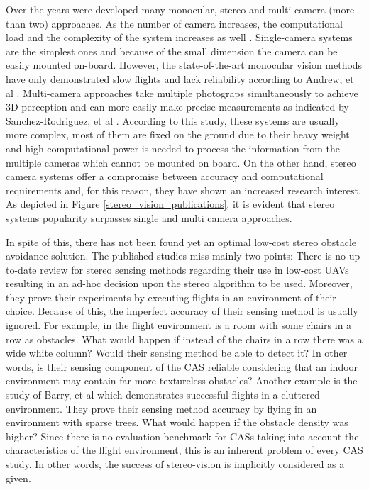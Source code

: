 Over the years were developed many monocular, stereo and multi-camera (more than two) approaches. As the number of camera increases, the computational load and the complexity of the system increases as well \cite{Sanchez-Rodriguez2018a}. Single-camera systems are the simplest ones and because of the small dimension the camera can be easily mounted on-board. However, the state-of-the-art monocular vision methods have only demonstrated slow flights and lack reliability according to Andrew, et al \cite{Barry2018}. Multi-camera approaches take multiple photograps simultaneously to achieve 3D perception and can more easily make precise measurements as indicated by Sanchez-Rodriguez, et al \cite{Sanchez-Rodriguez2018a}. According to this study, these systems are usually more complex, most of them are fixed on the ground due to their heavy weight and high computational power is needed to process the information from the multiple cameras which cannot be mounted on board. On the other hand, stereo camera systems offer a compromise between accuracy and computational requirements and, for this reason, they have shown an increased research interest. As depicted in Figure \ref{stereo_vision_publications}, it is evident that stereo systems popularity surpasses single and multi camera approaches. 

In spite of this, there has not been found yet an optimal low-cost stereo obstacle avoidance solution. The published studies miss mainly two points: There is no up-to-date review for stereo sensing methods regarding their use in low-cost \acp{UAV} resulting in an ad-hoc decision upon the stereo algorithm to be used. Moreover, they prove their experiments by executing flights in an environment of their choice. Because of this, the imperfect accuracy of their sensing method is usually ignored. For example, in \cite{Heng2011} the flight environment is a room with some chairs in a row as obstacles. What would happen if instead of the chairs in a row there was a wide white column? Would their sensing method be able to detect it? In other words, is their sensing component of the \ac{CAS} reliable considering that an indoor environment may contain far more textureless obstacles? Another example is the study of Barry, et al \cite{Barry2018} which demonstrates successful flights in a cluttered environment. They prove their sensing method accuracy by flying in an environment with sparse trees. What would happen if the obstacle density was higher? Since there is no evaluation benchmark for \acp{CAS} taking into account the characteristics of the flight environment, this is an inherent problem of every \ac{CAS} study. In other words, the success of stereo-vision is implicitly considered as a given.

